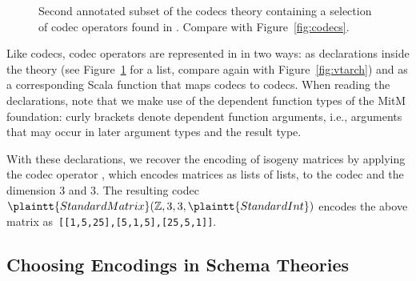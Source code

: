 \begin{figure}[ht]\centering
  \caption[List of Codec Operators]{
    Second annotated subset of the codecs theory containing a selection of codec operators found in \mmt. 
    Compare with Figure~\ref{fig:codecs}. 
  }
  \label{fig:codecops}
\end{figure}
Like codecs, codec operators are represented in \mmt in two ways: as declarations inside the theory  (see Figure~\ref{fig:codecops} for a list, compare again with Figure~\ref{fig:vtarch}) and as a corresponding Scala function that maps codecs to codecs. 
When reading the declarations, note that we make use of the dependent function types of the MitM foundation: curly brackets denote dependent function arguments, i.e., arguments that may occur in later argument types and the result type.

With these declarations, we recover the \lmfdb encoding of isogeny matrices by applying the codec operator , which encodes matrices as lists of lists, to the codec  and the dimension $3$ and $3$.
The resulting codec $\plaintt{StandardMatrix}(\mathbb{Z}, 3, 3, \plaintt{StandardInt})$ encodes the above matrix as\ \lstinline|[[1,5,25],[5,1,5],[25,5,1]]|.

\subsection{Choosing Encodings in Schema Theories}\label{sec:vt:schema}


